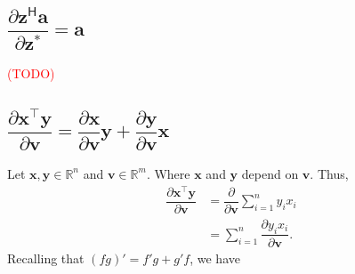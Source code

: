 \documentclass{article}
\newcommand{\trans}{\top}
\newcommand{\hermit}{\mathsf{H}}
\newcommand{\obs}[1]{\textcolor{red}{(#1)}}
\begin{document}
\subsection{\(\dfrac{\partial \mathbf{z}^\hermit \mathbf{a}}{\partial \mathbf{z}^*} = \mathbf{a}\)}
\obs{TODO} \cite{hjorungnes2011complex}

\subsection{\(\dfrac{\partial \mathbf{x}^\trans \mathbf{y}}{\partial \mathbf{v}} = \dfrac{\partial \mathbf{x}}{\partial \mathbf{v}}\mathbf{y} + \dfrac{\partial \mathbf{y}}{\partial \mathbf{v}}\mathbf{x}\)}
Let \(\mathbf{x},\mathbf{y} \in \mathbb{R}^{n}\) and \(\mathbf{v} \in \mathbb{R}^{m}\). Where \(\mathbf{x}\) and \(\mathbf{y}\) depend on \(\mathbf{v}\). Thus,
\begin{align}
    \dfrac{\partial \mathbf{x}^\trans \mathbf{y}}{\partial \mathbf{v}} & = \dfrac{\partial}{\partial \mathbf{v}}\sum_{i=1}^{n} y_ix_i \\
    & = \sum_{i=1}^{n} \dfrac{\partial y_ix_i}{\partial \mathbf{v}}.
\end{align}
Recalling that \((fg)' = f'g + g'f\), we have
\end{document}
